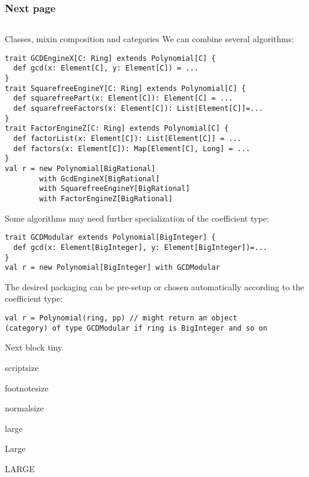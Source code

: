 \documentclass[final]{beamer}
\begin{document}
\begin{frame}[fragile] 
\frametitle{Next page}
\vfill

\begin{columns}[t]

\begin{column}{.3\linewidth}

  \begin{block}{\large Classes, mixin composition and categories}
\scriptsize
{\footnotesize We can combine several algorithms:}\par
\begin{lstlisting}
trait GCDEngineX[C: Ring] extends Polynomial[C] {
  def gcd(x: Element[C], y: Element[C]) = ...
}
trait SquarefreeEngineY[C: Ring] extends Polynomial[C] {
  def squarefreePart(x: Element[C]): Element[C] = ...
  def squarefreeFactors(x: Element[C]): List[Element[C]]=...
}
trait FactorEngineZ[C: Ring] extends Polynomial[C] {
  def factorList(x: Element[C]): List[Element[C]] = ...
  def factors(x: Element[C]): Map[Element[C], Long] = ...
}
val r = new Polynomial[BigRational]
        with GcdEngineX[BigRational] 
        with SquarefreeEngineY[BigRational]
        with FactorEngineZ[BigRational]
\end{lstlisting}
{\footnotesize Some algorithms may need further specialization
of the coefficient type:}\par
\begin{lstlisting}
trait GCDModular extends Polynomial[BigInteger] {
  def gcd(x: Element[BigInteger], y: Element[BigInteger])=...
}
val r = new Polynomial[BigInteger] with GCDModular
\end{lstlisting}
{\footnotesize The desired packaging can be pre-setup or chosen
automatically according to the coefficient type:}\par
\begin{lstlisting}
val r = Polynomial(ring, pp) // might return an object
(category) of type GCDModular if ring is BigInteger and so on
\end{lstlisting}
  \end{block}
  \hfill
  \begin{block}{\large Next block}
      \centering
      {\tiny tiny}\par
      {\scriptsize scriptsize}\par
      {\footnotesize footnotesize}\par
      {\normalsize normalsize}\par
      {\large large}\par
      {\Large Large}\par
      {\LARGE LARGE}\par
  \end{block}
\end{column}

%
%

\end{columns}

\vfill
\end{frame}
\end{document}

